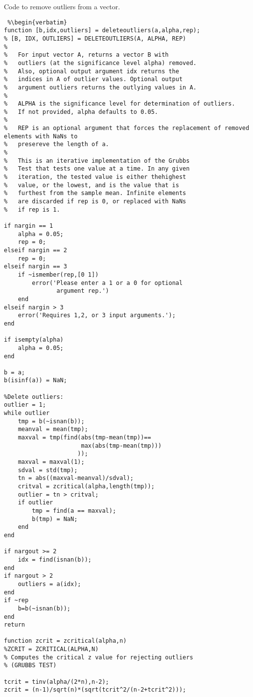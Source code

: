 Code to remove outliers from a vector.

\begin{lstlisting} %\begin{verbatim}
function [b,idx,outliers] = deleteoutliers(a,alpha,rep);
% [B, IDX, OUTLIERS] = DELETEOUTLIERS(A, ALPHA, REP)
%
%   For input vector A, returns a vector B with
%   outliers (at the significance level alpha) removed.
%   Also, optional output argument idx returns the
%   indices in A of outlier values. Optional output
%   argument outliers returns the outlying values in A.
%
%   ALPHA is the significance level for determination of outliers.
%   If not provided, alpha defaults to 0.05.
%
%   REP is an optional argument that forces the replacement of removed elements with NaNs to
%   presereve the length of a.
%
%   This is an iterative implementation of the Grubbs
%   Test that tests one value at a time. In any given
%   iteration, the tested value is either thehighest
%   value, or the lowest, and is the value that is
%   furthest from the sample mean. Infinite elements
%   are discarded if rep is 0, or replaced with NaNs
%   if rep is 1.

if nargin == 1
    alpha = 0.05;
    rep = 0;
elseif nargin == 2
    rep = 0;
elseif nargin == 3
    if ~ismember(rep,[0 1])
        error('Please enter a 1 or a 0 for optional
               argument rep.')
    end
elseif nargin > 3
    error('Requires 1,2, or 3 input arguments.');
end

if isempty(alpha)
    alpha = 0.05;
end

b = a;
b(isinf(a)) = NaN;

%Delete outliers:
outlier = 1;
while outlier
    tmp = b(~isnan(b));
    meanval = mean(tmp);
    maxval = tmp(find(abs(tmp-mean(tmp))==
                      max(abs(tmp-mean(tmp)))
                     ));
    maxval = maxval(1);
    sdval = std(tmp);
    tn = abs((maxval-meanval)/sdval);
    critval = zcritical(alpha,length(tmp));
    outlier = tn > critval;
    if outlier
        tmp = find(a == maxval);
        b(tmp) = NaN;
    end
end

if nargout >= 2
    idx = find(isnan(b));
end
if nargout > 2
    outliers = a(idx);
end
if ~rep
    b=b(~isnan(b));
end
return

function zcrit = zcritical(alpha,n)
%ZCRIT = ZCRITICAL(ALPHA,N)
% Computes the critical z value for rejecting outliers
% (GRUBBS TEST)

tcrit = tinv(alpha/(2*n),n-2);
zcrit = (n-1)/sqrt(n)*(sqrt(tcrit^2/(n-2+tcrit^2)));
\end{lstlisting} %
\clearpage


